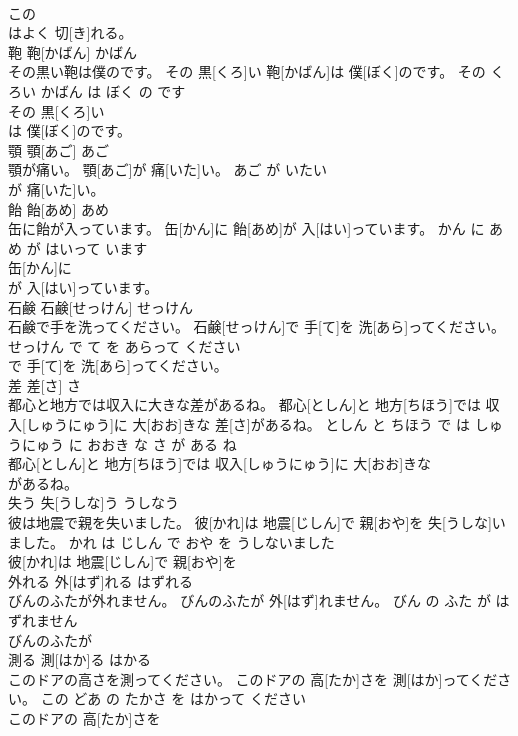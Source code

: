 \documentclass[8pt]{extreport}
\begin{document}
\begin{CJK}{UTF8}{min}
\\	この
\\	はよく 切[き]れる。		
\\	鞄	鞄[かばん]	かばん	
\\	その黒い鞄は僕のです。	その 黒[くろ]い 鞄[かばん]は 僕[ぼく]のです。	その くろい かばん は ぼく の です	
\\	その 黒[くろ]い
\\	は 僕[ぼく]のです。		
\\	顎	顎[あご]	あご	
\\	顎が痛い。	顎[あご]が 痛[いた]い。	あご が いたい	
\\	が 痛[いた]い。		
\\	飴	飴[あめ]	あめ	
\\	缶に飴が入っています。	缶[かん]に 飴[あめ]が 入[はい]っています。	かん に あめ が はいって います	
\\	缶[かん]に
\\	が 入[はい]っています。		
\\	石鹸	石鹸[せっけん]	せっけん	
\\	石鹸で手を洗ってください。	石鹸[せっけん]で 手[て]を 洗[あら]ってください。	せっけん で て を あらって ください	
\\	で 手[て]を 洗[あら]ってください。		
\\	差	差[さ]	さ	
\\	都心と地方では収入に大きな差があるね。	都心[としん]と 地方[ちほう]では 収入[しゅうにゅう]に 大[おお]きな 差[さ]があるね。	としん と ちほう で は しゅうにゅう に おおき な さ が ある ね	
\\	都心[としん]と 地方[ちほう]では 収入[しゅうにゅう]に 大[おお]きな
\\	があるね。		
\\	失う	失[うしな]う	うしなう	
\\	彼は地震で親を失いました。	彼[かれ]は 地震[じしん]で 親[おや]を 失[うしな]いました。	かれ は じしん で おや を うしないました	
\\	彼[かれ]は 地震[じしん]で 親[おや]を
\\	外れる	外[はず]れる	はずれる	
\\	びんのふたが外れません。	びんのふたが 外[はず]れません。	びん の ふた が はずれません	
\\	びんのふたが
\\	測る	測[はか]る	はかる	
\\	このドアの高さを測ってください。	このドアの 高[たか]さを 測[はか]ってください。	この どあ の たかさ を はかって ください	
\\	このドアの 高[たか]さを

\end{CJK}
\end{document}
